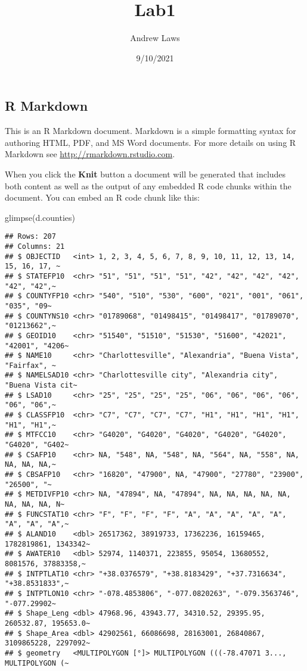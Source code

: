 \documentclass[
]{article}
\title{Lab1}
\author{Andrew Laws}
\date{9/10/2021}
\newenvironment{Shaded}{\begin{snugshade}}{\end{snugshade}}
\newcommand{\FunctionTok}[1]{\textcolor[rgb]{0.00,0.00,0.00}{#1}}
\newcommand{\NormalTok}[1]{#1}
\begin{document}
\maketitle

\hypertarget{r-markdown}{%
\subsection{R Markdown}\label{r-markdown}}

This is an R Markdown document. Markdown is a simple formatting syntax
for authoring HTML, PDF, and MS Word documents. For more details on
using R Markdown see \url{http://rmarkdown.rstudio.com}.

When you click the \textbf{Knit} button a document will be generated
that includes both content as well as the output of any embedded R code
chunks within the document. You can embed an R code chunk like this:

\begin{Shaded}
\begin{Highlighting}[]
\FunctionTok{glimpse}\NormalTok{(d.counties)}
\end{Highlighting}
\end{Shaded}

\begin{verbatim}
## Rows: 207
## Columns: 21
## $ OBJECTID   <int> 1, 2, 3, 4, 5, 6, 7, 8, 9, 10, 11, 12, 13, 14, 15, 16, 17, ~
## $ STATEFP10  <chr> "51", "51", "51", "51", "42", "42", "42", "42", "42", "42",~
## $ COUNTYFP10 <chr> "540", "510", "530", "600", "021", "001", "061", "035", "09~
## $ COUNTYNS10 <chr> "01789068", "01498415", "01498417", "01789070", "01213662",~
## $ GEOID10    <chr> "51540", "51510", "51530", "51600", "42021", "42001", "4206~
## $ NAME10     <chr> "Charlottesville", "Alexandria", "Buena Vista", "Fairfax", ~
## $ NAMELSAD10 <chr> "Charlottesville city", "Alexandria city", "Buena Vista cit~
## $ LSAD10     <chr> "25", "25", "25", "25", "06", "06", "06", "06", "06", "06",~
## $ CLASSFP10  <chr> "C7", "C7", "C7", "C7", "H1", "H1", "H1", "H1", "H1", "H1",~
## $ MTFCC10    <chr> "G4020", "G4020", "G4020", "G4020", "G4020", "G4020", "G402~
## $ CSAFP10    <chr> NA, "548", NA, "548", NA, "564", NA, "558", NA, NA, NA, NA,~
## $ CBSAFP10   <chr> "16820", "47900", NA, "47900", "27780", "23900", "26500", "~
## $ METDIVFP10 <chr> NA, "47894", NA, "47894", NA, NA, NA, NA, NA, NA, NA, NA, N~
## $ FUNCSTAT10 <chr> "F", "F", "F", "F", "A", "A", "A", "A", "A", "A", "A", "A",~
## $ ALAND10    <dbl> 26517362, 38919733, 17362236, 16159465, 1782819861, 1343342~
## $ AWATER10   <dbl> 52974, 1140371, 223855, 95054, 13680552, 8081576, 37883358,~
## $ INTPTLAT10 <chr> "+38.0376579", "+38.8183429", "+37.7316634", "+38.8531833",~
## $ INTPTLON10 <chr> "-078.4853806", "-077.0820263", "-079.3563746", "-077.29902~
## $ Shape_Leng <dbl> 47968.96, 43943.77, 34310.52, 29395.95, 260532.87, 195653.0~
## $ Shape_Area <dbl> 42902561, 66086698, 28163001, 26840867, 3109865228, 2297092~
## $ geometry   <MULTIPOLYGON [°]> MULTIPOLYGON (((-78.47071 3..., MULTIPOLYGON (~
\end{verbatim}
\end{document}
